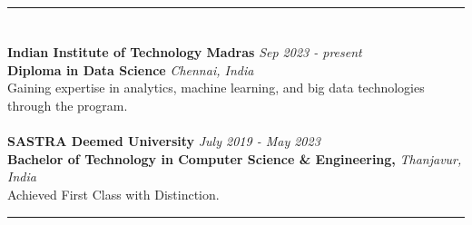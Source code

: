 \documentclass[a4paper,10pt]{article}
\begin{document}
\vspace{2mm}

\hrule
\section{\scshape\color{Fuchsia}{\faGraduationCap\ \textbf EDUCATION}}
\textbf{Indian Institute of Technology Madras} \href{https://drive.google.com/file/d/1HUZf7LIsTZaPjUkf3tKMAnduHmgObdS1/view?usp=sharing}{} \hfill \textit{Sep 2023 - present} \\
\textbf{Diploma in Data Science} \hfill \textit{Chennai, India} \\
Gaining expertise in analytics, machine learning, and big data technologies through the program. \\
\\
\textbf{SASTRA Deemed University} \href{https://drive.google.com/file/d/1phkkQpvXzo3_0dZZnujCL_nOU1YJfxKO/view?usp=sharing}{} \hfill \textit{July 2019 - May 2023} \\
\textbf{Bachelor of Technology in Computer Science \& Engineering,} \hfill \textit{Thanjavur, India} \\
Achieved First Class with Distinction. \\

\hrule
\end{document}
